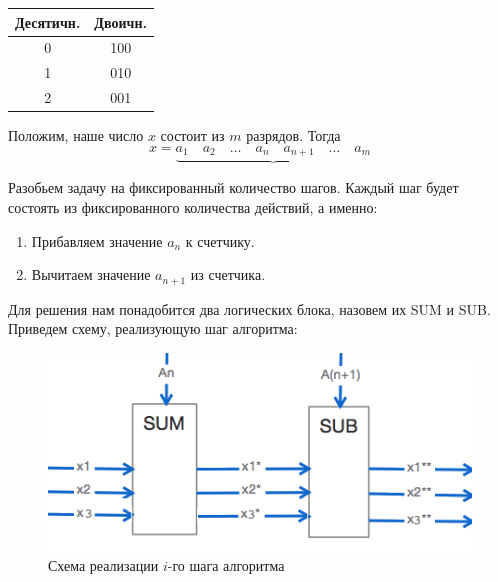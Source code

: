 \documentclass[utf8x, 12pt]{G7-32}
\begin{document}
\begin{table}[hhh!]
	\begin{center}
		\begin{tabular}{|c|c|}
		\hline
		Десятичн. & Двоичн.\\
		\hline
		0 & 100 \\
		1 & 010 \\
		2 & 001 \\
		\hline
		\end{tabular}
	\end{center}	
\end{table}


Положим, наше число $x$ состоит из $m$ разрядов. Тогда
\begin{equation} \label{eq:ex2}
x = \underbrace{a_1 \quad a_2 \quad \dots \quad a_n \quad a_{n+1} \quad \dots \quad a_m}
\end{equation}

\bigskip

Разобьем задачу на фиксированный количество шагов. Каждый шаг будет состоять из фиксированного количества действий, а именно:
\begin{enumerate}
	\item Прибавляем значение $a_n$ к счетчику.
	\item Вычитаем значение $a_{n+1}$ из счетчика.
\end{enumerate}

\newpage

Для решения нам понадобится два логических блока, назовем их SUM и SUB. Приведем схему, реализующую шаг алгоритма:

\begin{figure}[hhh!]
\begin{center}
\includegraphics[width=14cm]{img/shema}
\end{center}
\vspace{-5mm}\caption{Схема реализации $i$-го шага алгоритма}
\end{figure}
\end{document}
